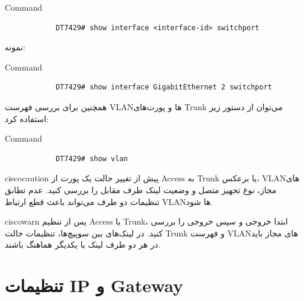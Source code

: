 \documentclass[11pt,letterpaper]{report}
\newenvironment{cautionbox}[1]{%
	\begin{noticebox}[title={\textbf{\faExclamationTriangle\ #1}}]{ciscocaution}
	}{%
	\end{noticebox}
}
\newenvironment{tipbox}[1]{%
	\begin{noticebox}[title={\textbf{\faLightbulb\ #1}}]{ciscowarn}
	}{%
	\end{noticebox}
}
\begin{document}
	\begin{latin}
		\begin{cliexample}{Command}
			\begin{verbatim}
			DT7429# show interface <interface-id> switchport
			\end{verbatim}
		\end{cliexample}
	\end{latin}
			نمونه:

	\begin{latin}
		\begin{cliexample}{Command}
			\begin{verbatim}
			DT7429# show interface GigabitEthernet 2 switchport
			\end{verbatim}
		\end{cliexample}
	\end{latin}
			همچنین برای بررسی فهرست VLANها و پورت‌های Trunk می‌توان از
		دستور زیر استفاده کرد:

	\begin{latin}
		\begin{cliexample}{Command}
			\begin{verbatim}
			DT7429# show vlan
			\end{verbatim}
		\end{cliexample}
	\end{latin}

	\begin{cautionbox}{نکته مهم درباره Trunk}			پیش از تغییر حالت یک پورت از Access به Trunk یا برعکس، VLANهای
			مجاز، نوع تجهیز متصل و وضعیت لینک طرف مقابل را بررسی کنید.			عدم تطابق تنظیمات دو طرف می‌تواند باعث قطع ارتباط VLANها شود.
		\end{cautionbox}

	\begin{tipbox}{روش پیشنهادی بررسی}			پس از تنظیم Access یا Trunk، ابتدا خروجی
			 و سپس خروجی
		 را بررسی کنید. در لینک‌های بین سوییچ‌ها، تنظیمات			حالت Trunk و فهرست VLANهای مجاز باید در هر دو طرف لینک با یکدیگر
			هماهنگ باشند.
	\end{tipbox}

	\fi

	\chapter{تنظیمات IP و Gateway}
\end{document}
